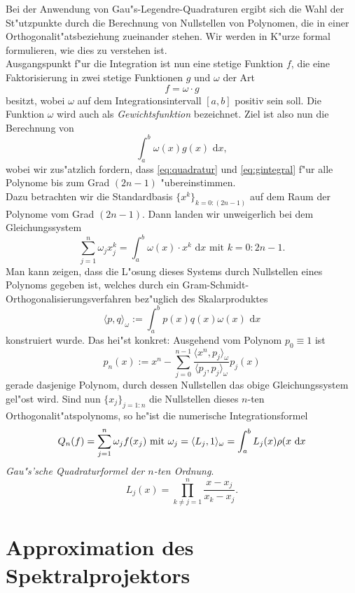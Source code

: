 Bei der Anwendung von Gau"s-Legendre-Quadraturen ergibt sich die Wahl der St"utzpunkte durch die Berechnung von Nullstellen von Polynomen, die in einer Orthogonalit"atsbeziehung zueinander stehen.
Wir werden in K"urze formal formulieren, wie dies zu verstehen ist.\\

Ausgangspunkt f"ur die Integration ist nun eine stetige Funktion $f$, die eine Faktorisierung in zwei stetige Funktionen $g$ und $\omega$ der Art
\[
f = \omega \cdot g
\]
besitzt, wobei $\omega$ auf dem Integrationsintervall $[a,b]$ positiv sein soll. Die Funktion $\omega$ wird auch als \emph{Gewichtsfunktion} bezeichnet.
Ziel ist also nun die Berechnung von
\begin{equation}\label{eq:gintegral}
\int_a^b \omega(x)g(x) \text{ d}x,
\end{equation}
wobei wir zus"atzlich fordern, dass \eqref{eq:quadratur} und \eqref{eq:gintegral} f"ur alle Polynome bis zum Grad $(2n-1)$ "ubereinstimmen.\\

Dazu betrachten wir die Standardbasis $\{x^k\}_{k=0:(2n-1)}$ auf dem Raum der Polynome vom
Grad $(2n-1)$. Dann landen wir unweigerlich bei dem
Gleichungssystem
\[
\sum_{j=1}^n \omega_j x_j^k = \int_a^b \omega(x)\cdot x^k \text{ d}x \text{ mit } k = 0:2n-1.
\]
Man kann zeigen, dass die L"osung dieses Systems durch Nullstellen eines Polynoms gegeben ist, welches durch
ein Gram-Schmidt-Orthogonalisierungsverfahren bez"uglich des Skalarproduktes
\[
\langle p,q\rangle_\omega := \int_a^b p(x) q(x)\omega(x) \text{ d}x
\]
konstruiert wurde. Das hei"st konkret: Ausgehend vom Polynom $p_0 \equiv 1$ ist
\[
p_n(x) := x^n - \sum_{j=0}^{n-1} \frac{\langle x^n, p_j \rangle_\omega}{\langle p_j, p_j\rangle_\omega} p_j (x)
\]
gerade dasjenige Polynom, durch dessen Nullstellen das obige Gleichungssystem gel"ost wird. Sind nun
$\{x_j\}_{j=1:n}$ die Nullstellen dieses $n$-ten Orthogonalit"atspolynoms, so he"ist die numerische
Integrationsformel
\[
Q_n(f) = \sum_{j=1}^n \omega_j f(x_j) \text{ mit }
\omega_j = \langle L_j, 1 \rangle_\omega
= \int_a^b L_j(x)\rho(x\text{ d}x
\]
\emph{Gau"s'sche Quadraturformel der $n$-ten Ordnung}.
\[
L_j(x) = \prod_{k\neq j=1}^n \frac{x-x_j}{x_k - x_j}.
\]

\newpage

\section{Approximation des Spektralprojektors}

